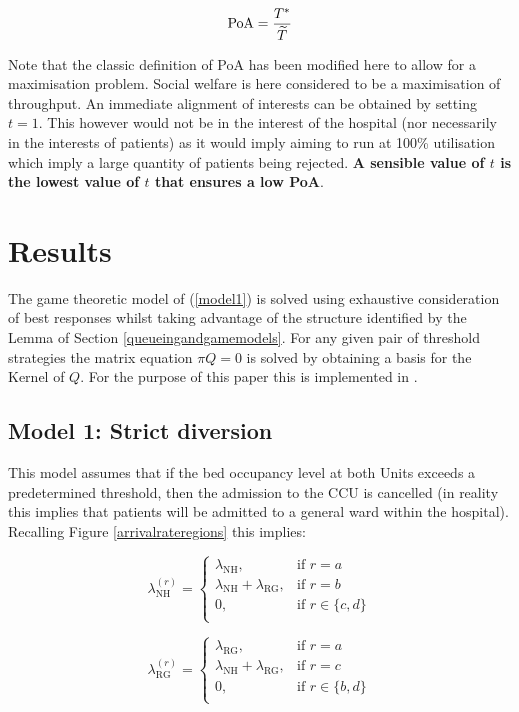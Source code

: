 \documentclass{article}
\newcommand{\NH}{\text{NH}}
\newcommand{\RG}{\text{RG}}
\begin{document}
$$\text{PoA}={{T^*}\over{\widetilde{T}}}$$

Note that the classic definition of PoA has been modified here to allow for a maximisation problem.
Social welfare is here considered to be a maximisation of throughput.
An immediate alignment of interests can be obtained by setting $t=1$.
This however would not be in the interest of the hospital (nor necessarily in the interests of patients) as it would imply aiming to run at 100\% utilisation which imply a large quantity of patients being rejected.
\textbf{A sensible value of $t$ is the lowest value of $t$ that ensures a low PoA}.

\section{Results}\label{results}

The game theoretic model of (\ref{model1}) is solved using exhaustive consideration of best responses whilst taking advantage of the structure identified by the Lemma of Section \ref{queueingandgamemodels}. For any given pair of threshold strategies the matrix equation $\pi Q=0$ is solved by obtaining a basis for the Kernel of $Q$. For the purpose of this paper this is implemented in \cite{sage}.

\subsection{Model 1: Strict diversion}

This model assumes that if the bed occupancy level at both Units exceeds a predetermined threshold, then the admission to the CCU is cancelled (in reality this implies that patients will be admitted to a general ward within the hospital).
Recalling Figure \ref{arrivalrateregions} this implies:

\begin{minipage}[t]{0.5\textwidth}
\small{$$\lambda_{\NH}^{(r)}=\begin{cases}
\lambda_{\NH}, &\text{if }r=a\\
\lambda_{\NH}+\lambda_{\RG},  &\text{if }r=b\\
0, &\text{if }r\in\{c,d\}\\
\end{cases}$$}
\end{minipage}
\begin{minipage}[t]{0.5\textwidth}
\small{$$\lambda_{\RG}^{(r)}=\begin{cases}
\lambda_{\RG}, &\text{if }r=a\\
\lambda_{\NH}+\lambda_{\RG},  &\text{if }r=c\\
0, &\text{if }r\in\{b,d\}\\
\end{cases}$$}
\end{minipage}
\end{document}
